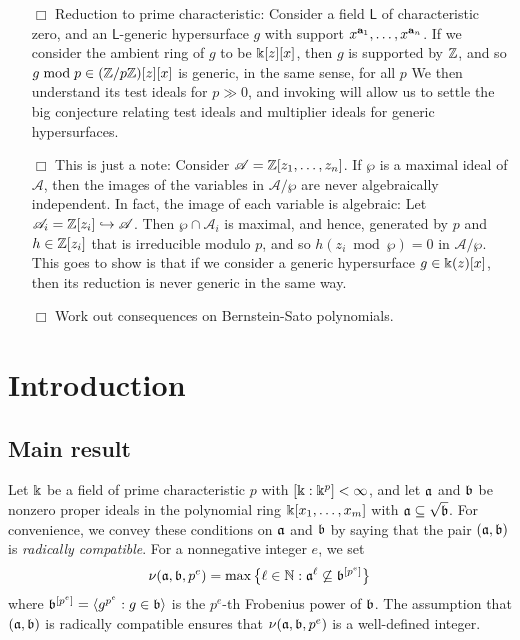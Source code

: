 \documentclass{amsart}
\begin{document}
{\begin{enumerate}
 \item[$\Box$] Reduction to prime characteristic:  Consider a field $\mathsf{L}$ of characteristic zero, and an $\mathsf{L}$-generic hypersurface $g$ with support $x^{\mathbf{a}_1}, \ldots, x^{\mathbf{a}_n}$.  If we consider the ambient ring of $g$ to be $\Bbbk[z][x]$, then $g$ is supported by $\mathbb{Z}$, and so $g \bmod p \in (\mathbb{Z}/p\mathbb{Z})[z][x]$ is generic, in the same sense, for all $p$ We then understand its test ideals for $p \gg 0$, and invoking  will allow us to settle the big conjecture relating test ideals and multiplier ideals for generic hypersurfaces.
 \item[$\Box$]  This is just a note: Consider $\mathscr{A} = \mathbb{Z}[z_1, \ldots, z_n]$.  If $\wp$ is a maximal ideal of $\mathscr{A}$, then the images of the variables in $\mathscr{A}/\wp$ are never algebraically independent.  In fact, the image of each variable is algebraic:  Let $\mathscr{A}_i= \mathbb{Z}[z_i] \hookrightarrow \mathscr{A}$.  Then $\wp \cap \mathscr{A}_i$ is maximal, and hence, generated by $p$ and $h \in \mathbb{Z}[z_i]$ that is irreducible modulo $p$, and so $h(z_i \bmod \wp) = 0$ in $\mathscr{A}/\wp$.  This goes to show is that if we consider a generic hypersurface $g \in \Bbbk(z)[x]$, then its reduction is never generic in the same way.  
 \item[$\Box$] Work out consequences on Bernstein-Sato polynomials. 
\end{enumerate}
}
\newpage

\setcounter{tocdepth}{1}
\tableofcontents

\section{Introduction}

\subsection{Main result}

Let $\Bbbk$ be a field of prime characteristic $p$ with $[\Bbbk:\Bbbk^p] < \infty$, and let $\mathfrak{a}$ and $\mathfrak{b}$ be nonzero proper ideals in the polynomial ring $\Bbbk[x_1,\ldots,x_m]$ with $\mathfrak{a} \subseteq \sqrt {\mathfrak{b}}$.
For convenience, we convey these conditions on $\mathfrak{a}$ and $\mathfrak{b}$ by saying that the pair $(\mathfrak{a},\mathfrak{b})$ is \emph{radically compatible}.
For a nonnegative integer $e$, we set
\begin{equation}
   \nu(\mathfrak{a},\mathfrak{b},p^e) = \max\big\{\ell\in \mathbb{N} : \mathfrak{a}^{\ell} \not\subseteq \mathfrak{b}^{[p^e]}\big\}
   \label{eq: nu definition}
\end{equation}
where $\mathfrak{b}^{[p^e]} = \langle g^{p^e} : g \in \mathfrak{b} \rangle$ is the $p^e$-th Frobenius power of $\mathfrak{b}$.
The assumption that $(\mathfrak{a}, \mathfrak{b})$ is radically compatible ensures that $\nu(\mathfrak{a}, \mathfrak{b}, p^e)$ is a well-defined integer.
\end{document}
